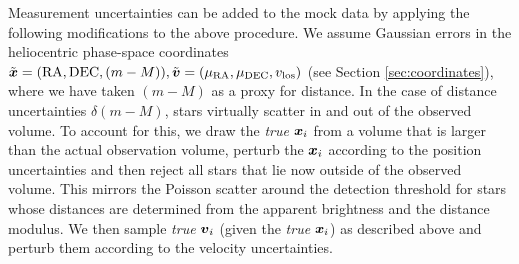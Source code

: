 Measurement uncertainties can be added to the mock data by applying the following modifications to the above procedure. We assume Gaussian errors in the heliocentric phase-space coordinates $\tilde{\boldsymbol{x}} = (\text{RA},\text{DEC},(m-M)), \tilde{\boldsymbol{v}} = (\mu_\text{RA},\mu_\text{DEC},v_\text{los})$ (see Section \ref{sec:coordinates}), where we have taken $(m-M)$ as a proxy for distance. In the case of distance uncertainties $\delta(m-M)$, stars virtually scatter in and out of the observed volume. To account for this, we draw the \emph{true} $\boldsymbol{x}_i$ from a volume that is larger than the actual observation volume, perturb the $\boldsymbol{x}_i$ according to the position uncertainties and then reject all stars that lie now outside of the observed volume. This mirrors the Poisson scatter around the detection threshold for stars whose distances are determined from the apparent brightness and the distance modulus. We then sample \emph{true} $\boldsymbol{v}_i$ (given the \emph{true} $\boldsymbol{x}_i$) as described above and perturb them according to the velocity uncertainties.

